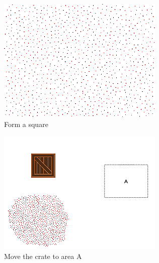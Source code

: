 \documentclass[]{article}
\begin{document}
\begin{figure}
\begin{subfigure}{0.42\textwidth}
		\includegraphics[width=\linewidth]{slide_images/Swarm_Robot_Control_-_1000_Robot_0023.png}
		\caption{Form a square}
		\label{fig:sub1}
	\end{subfigure}%
	\begin{subfigure}{0.42\textwidth}
		\centering
		\includegraphics[width=\linewidth]{slide_images/Swarm_Robot_Control_-_1000_Robot_0025.png}
		\caption{Move the crate to area A}
		\label{fig:sub1}
	\end{subfigure}
	\begin{subfigure}{0.42\textwidth}
		\centering

\end{subfigure}
\end{figure}
\end{document}

